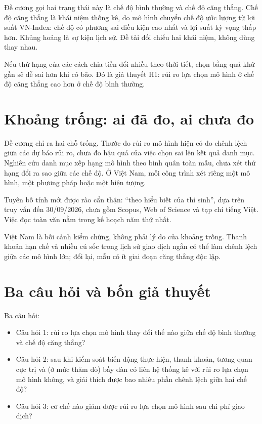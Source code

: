 Đề cương gọi hai trạng thái này là chế độ bình thường và chế độ căng thẳng. Chế độ căng thẳng là khái niệm thống kê, do mô hình chuyển chế độ ước lượng từ lợi suất VN-Index: chế độ có phương sai điều kiện cao nhất và lợi suất kỳ vọng thấp hơn. Khủng hoảng là sự kiện lịch sử. Đề tài đối chiếu hai khái niệm, không dùng thay nhau.

Nếu thứ hạng của các cách chia tiền đổi nhiều theo thời tiết, chọn bằng quá khứ gần sẽ dễ sai hơn khi có bão. Đó là giả thuyết H1: rủi ro lựa chọn mô hình ở chế độ căng thẳng cao hơn ở chế độ bình thường.

\section{Khoảng trống: ai đã đo, ai chưa đo}

Đề cương chỉ ra hai chỗ trống. Thước đo rủi ro mô hình hiện có đo chênh lệch giữa các dự báo rủi ro, chưa đo hậu quả của việc chọn sai lên kết quả danh mục. Nghiên cứu danh mục xếp hạng mô hình theo bình quân toàn mẫu, chưa xét thứ hạng đổi ra sao giữa các chế độ. Ở Việt Nam, mỗi công trình xét riêng một mô hình, một phương pháp hoặc một hiện tượng.

Tuyên bố tính mới được rào cẩn thận: “theo hiểu biết của thí sinh”, dựa trên truy vấn đến 30/09/2026, chưa gồm Scopus, Web of Science và tạp chí tiếng Việt. Việc đọc toàn văn nằm trong kế hoạch năm thứ nhất.

Việt Nam là bối cảnh kiểm chứng, không phải lý do của khoảng trống. Thanh khoản hạn chế và nhiều cú sốc trong lịch sử giao dịch ngắn có thể làm chênh lệch giữa các mô hình lớn; đổi lại, mẫu có ít giai đoạn căng thẳng độc lập.

\section{Ba câu hỏi và bốn giả thuyết}

Ba câu hỏi:

\begin{itemize}
\item
  Câu hỏi 1: rủi ro lựa chọn mô hình thay đổi thế nào giữa chế độ bình thường và chế độ căng thẳng?
\item
  Câu hỏi 2: sau khi kiểm soát biến động thực hiện, thanh khoản, tương quan cực trị và (ở mức thăm dò) bầy đàn có liên hệ thống kê với rủi ro lựa chọn mô hình không, và giải thích được bao nhiêu phần chênh lệch giữa hai chế độ?
\item
  Câu hỏi 3: cơ chế nào giảm được rủi ro lựa chọn mô hình sau chi phí giao dịch?
\end{itemize}

